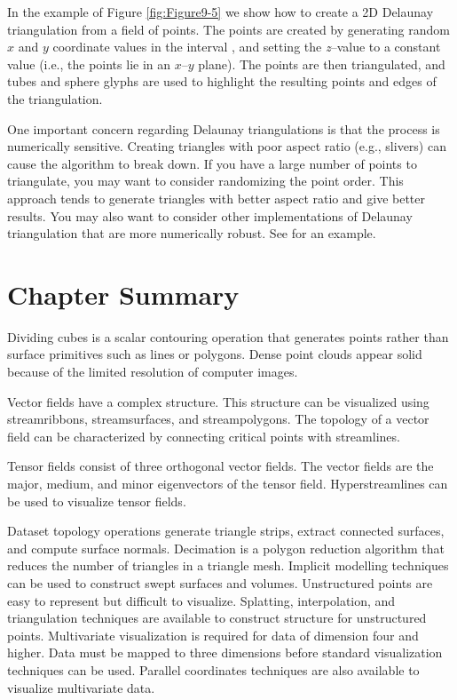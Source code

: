 In the example of Figure \ref{fig:Figure9-5} we show how to create a 2D Delaunay triangulation from a field of points. The points are created by generating random $x$ and $y$ coordinate values in the interval \cite{0, 1}, and setting the \emph{z}--value to a constant value (i.e., the points lie in an $x$--$y$ plane). The points are then triangulated, and tubes and sphere glyphs are used to highlight the resulting points and edges of the triangulation.

One important concern regarding Delaunay triangulations is that the process is numerically sensitive. Creating triangles with poor aspect ratio (e.g., slivers) can cause the algorithm to break down. If you have a large number of points to triangulate, you may want to consider randomizing the point order. This approach tends to generate triangles with better aspect ratio and give better results. You may also want to consider other implementations of Delaunay triangulation that are more numerically robust. See \cite{Edelsbrunner94} for an example.

\section{Chapter Summary}

Dividing cubes is a scalar contouring operation that generates points rather than surface primitives such as lines or polygons. Dense point clouds appear solid because of the limited resolution of computer images.

Vector fields have a complex structure. This structure can be visualized using streamribbons, streamsurfaces, and streampolygons. The topology of a vector field can be characterized by connecting critical points with streamlines.

Tensor fields consist of three orthogonal vector fields. The vector fields are the major, medium, and minor eigenvectors of the tensor field. Hyperstreamlines can be used to visualize tensor fields.

Dataset topology operations generate triangle strips, extract connected surfaces, and compute surface normals. Decimation is a polygon reduction algorithm that reduces the number of triangles in a triangle mesh. Implicit modelling techniques can be used to construct swept surfaces and volumes. Unstructured points are easy to represent but difficult to visualize. Splatting, interpolation, and triangulation techniques are available to construct structure for unstructured points. Multivariate visualization is required for data of dimension four and higher. Data must be mapped to three dimensions before standard visualization techniques can be used. Parallel coordinates techniques are also available to visualize multivariate data.

